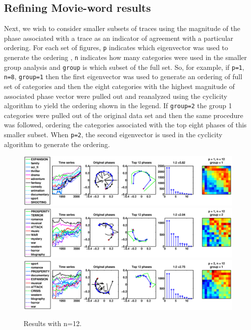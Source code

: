 \documentclass[11pt]{article}
\begin{document}
\subsection{Refining Movie-word results}
Next, we wish to consider smaller subsets of traces using the magnitude of the phase associated with a trace as an indicator of agreement with a particular ordering. For each set of figures, \verb|p| indicates which eigenvector was used to generate the ordering , \verb|n| indicates how many categories were used in the smaller group analysis and \verb|group| is which subset of the full set. So, for example, if \verb|p=1|, \verb|n=8|, \verb|group=1| then the first eigenvector was used to generate an ordering of full set of categories and then the eight categories with the highest magnitude of associated phase vector were pulled out and reanalyzed using the cyclicity algorithm to yield the ordering shown in the legend. If \verb|group=2| the group 1 categories were pulled out of the original data set and then the same procedure was followed, ordering the categories associated with the top eight phases of this smaller subset. When \verb|p=2|, the second eigenvector is used in the cyclicity algorithm to generate the ordering.

\begin{figure}[H]
\includegraphics[trim = 0 0 130 0, clip, width=\textwidth]{pictures/_p1_n12_gp1.eps}
\includegraphics[trim = 0 0 130 0, clip, width=\textwidth]{pictures/_p1_n12_gp2.eps}
\includegraphics[trim = 0 0 130 0, clip, width=\textwidth]{pictures/_p2_n12_gp1.eps}
\caption{Results with n=12.}
\end{figure}
\end{document}
